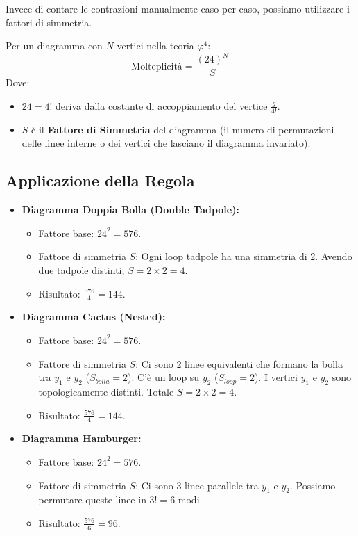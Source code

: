 Invece di contare le contrazioni manualmente caso per caso, possiamo utilizzare i fattori di simmetria.

\begin{tcolorbox}[colback=yellow!25, colframe=yellow!75!orange, coltitle=black, title=\textbf{Regola della Molteplicità}]

Per un diagramma con $N$ vertici nella teoria $\varphi^4$:
\begin{equation}
    \text{Molteplicità} = \frac{(24)^N}{S}
\end{equation}
Dove:
\begin{itemize}
    \item $24 = 4!$ deriva dalla costante di accoppiamento del vertice $\frac{g}{4!}$.
    \item $S$ è il \textbf{Fattore di Simmetria} del diagramma (il numero di permutazioni delle linee interne o dei vertici che lasciano il diagramma invariato).
\end{itemize}
\end{tcolorbox}

\subsection*{Applicazione della Regola}
\begin{itemize}
    \item \textbf{Diagramma Doppia Bolla (Double Tadpole):}
    \begin{itemize}
        \item Fattore base: $24^2 = 576$.
        \item Fattore di simmetria $S$: Ogni loop tadpole ha una simmetria di 2. Avendo due tadpole distinti, $S = 2 \times 2 = 4$.
        \item Risultato: $\frac{576}{4} = 144$.
    \end{itemize}

    \item \textbf{Diagramma Cactus (Nested):}
    \begin{itemize}
        \item Fattore base: $24^2 = 576$.
        \item Fattore di simmetria $S$: Ci sono 2 linee equivalenti che formano la bolla tra $y_1$ e $y_2$ ($S_{bolla}=2$). C'è un loop su $y_2$ ($S_{loop}=2$). I vertici $y_1$ e $y_2$ sono topologicamente distinti. Totale $S = 2 \times 2 = 4$.
        \item Risultato: $\frac{576}{4} = 144$.
    \end{itemize}
    
    \item \textbf{Diagramma Hamburger:}
    \begin{itemize}
        \item Fattore base: $24^2 = 576$.
        \item Fattore di simmetria $S$: Ci sono 3 linee parallele tra $y_1$ e $y_2$. Possiamo permutare queste linee in $3! = 6$ modi.
        \item Risultato: $\frac{576}{6} = 96$.
    \end{itemize}
\end{itemize}

